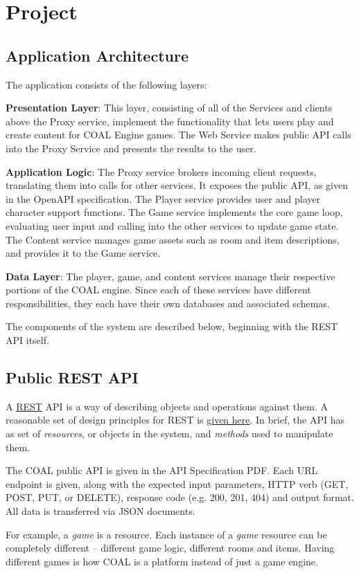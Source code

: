 \documentclass{article}
\newcommand{\enterProblemHeader}[1]{
}
\newcommand{\exitProblemHeader}[1]{
\nobreak\extramarks{#1}{}\nobreak
}
\newcounter{homeworkProblemCounter} %
\newcommand{\homeworkProblemName}{}
\newenvironment{homeworkProblem}[1][Problem \arabic{homeworkProblemCounter}]{ %
\stepcounter{homeworkProblemCounter} %
\renewcommand{\homeworkProblemName}{#1} %
\section{\homeworkProblemName} %
\enterProblemHeader{\homeworkProblemName} %
}{
\exitProblemHeader{\homeworkProblemName} %
}
\newcommand{\homeworkSectionName}{}
\newenvironment{homeworkSection}[1]{ %
\renewcommand{\homeworkSectionName}{#1} %
\subsection{\homeworkSectionName} %
\enterProblemHeader{\homeworkProblemName\ [\homeworkSectionName]} %
}{
\enterProblemHeader{\homeworkProblemName} %
}
\begin{document}
\begin{homeworkProblem}[Project]
\begin{homeworkSection}{Application Architecture}
The application consists of the following layers:

\begin{compactitem}
	\item \textbf{Presentation Layer}: This layer, consisting of all of the Services and clients above the Proxy service, implement the functionality that lets users play and create content for COAL Engine games. The Web Service makes public API calls into the Proxy Service and presents the results to the user.
	\item \textbf{Application Logic}: The Proxy service brokers incoming client requests, translating them into calls for other services. It exposes the public API, as given in the OpenAPI specification. The Player service provides user and player character support functions. The Game service implements the core game loop, evaluating user input and calling into the other services to update game state. The Content service manages game assets such as room and item descriptions, and provides it to the Game service.
	\item \textbf{Data Layer}: The player, game, and content services manage their respective portions of the COAL engine. Since each of these services have different responsibilities, they each have their own databases and associated schemas.
\end{compactitem}

The components of the system are described below, beginning with the REST API itself.
\end{homeworkSection}


\begin{homeworkSection}{Public REST API}
	A \href{https://en.wikipedia.org/wiki/Representational_state_transfer}{REST} API is a way of describing objects and operations against them. A reasonable set of design principles for REST is \href{https://restfulapi.net/}{given here}. In brief, the API has as set of \textit{resources}, or objects in the system, and \textit{methods} used to manipulate them.

	The COAL public API is given in the API Specification PDF. Each URL endpoint is given, along with the expected input parameters, HTTP verb (GET, POST, PUT, or DELETE),  response code (e.g. 200, 201, 404) and output format. All data is transferred via JSON documents.

	For example, a \textit{game} is a resource. Each instance of a \textit{game} resource can be completely different -- different game logic, different rooms and items. Having different games is how COAL is a platform instead of just a game engine.


\end{homeworkSection}
\end{homeworkProblem}
\end{document}
